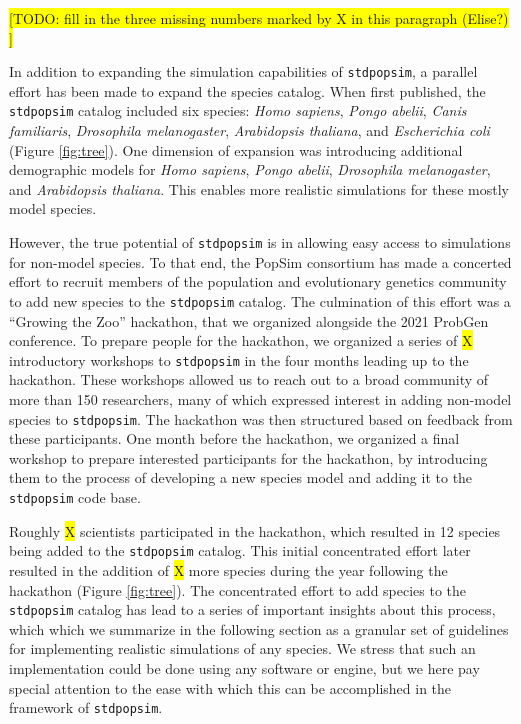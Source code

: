 \documentclass[hidelinks]{article}
\newcommand{\stdpopsim}{\texttt{stdpopsim}\xspace}
\begin{document}
\colorbox{yellow}{[TODO: fill in the three missing numbers marked by X in this paragraph (Elise?) ]}

In addition to expanding the simulation capabilities of \stdpopsim,
a parallel effort has been made to expand the species catalog.
When first published, the \stdpopsim catalog included six species:
\emph{Homo sapiens}, \emph{Pongo abelii}, \emph{Canis familiaris}, \emph{Drosophila melanogaster},
\emph{Arabidopsis thaliana}, and \emph{Escherichia coli} (Figure \ref{fig:tree}).
One dimension of expansion was introducing additional demographic models
for \emph{Homo sapiens}, \emph{Pongo abelii}, \emph{Drosophila melanogaster},
and \emph{Arabidopsis thaliana}. This enables more realistic simulations for these
mostly model species.

However, the true potential of \stdpopsim is in allowing easy access to simulations
for non-model species. To that end, the PopSim consortium has made a concerted
effort to recruit members of the population and evolutionary genetics community
to add new species to the \stdpopsim catalog. The culmination of this effort was a
``Growing the Zoo'' hackathon, that we organized alongside the 2021 ProbGen conference.
To prepare people for the hackathon, we organized a series of \colorbox{yellow}{X}
introductory workshops to \stdpopsim in the four months leading up to the hackathon.
These workshops allowed us to reach out to a broad community of more than 150 researchers,
many of which expressed interest in adding non-model species to \stdpopsim.
The hackathon was then structured based on feedback from these participants.
One month before the hackathon, we organized a final workshop to prepare interested
participants for the hackathon, by introducing them to  the process of developing
a new species model and adding it to the \stdpopsim code base.

Roughly \colorbox{yellow}{X} scientists participated in the hackathon,
which resulted in 12 species being added to the \stdpopsim catalog.
This initial concentrated effort later resulted in the addition
of \colorbox{yellow}{X} more species during the year following the hackathon (Figure \ref{fig:tree}).
The concentrated effort to add species to the \stdpopsim catalog
has lead to a series of important insights about this process,
which which we summarize in the following section as a granular set of guidelines
for implementing realistic simulations of any species. We stress that such
an implementation could be done using any software or engine, but we
here pay special attention to the ease with which this can be accomplished
in the framework of \stdpopsim.
\end{document}
